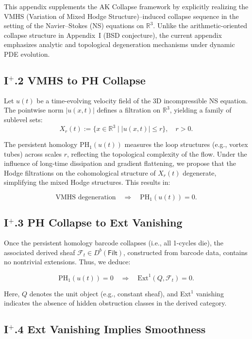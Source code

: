 \documentclass[11pt]{article}
\begin{document}
This appendix supplements the AK Collapse framework by explicitly realizing  
the VMHS (Variation of Mixed Hodge Structure)–induced collapse sequence  
in the setting of the Navier--Stokes (NS) equations on \( \mathbb{R}^3 \).  
Unlike the arithmetic-oriented collapse structure in Appendix~I (BSD conjecture),  
the current appendix emphasizes analytic and topological degeneration mechanisms  
under dynamic PDE evolution.

\subsection*{I$^+$.2 VMHS to PH Collapse}

Let \( u(t) \) be a time-evolving velocity field of the 3D incompressible NS equation.  
The pointwise norm \( |u(x,t)| \) defines a filtration on \( \mathbb{R}^3 \),  
yielding a family of sublevel sets:
\[
X_r(t) := \{ x \in \mathbb{R}^3 \mid |u(x,t)| \leq r \}, \quad r > 0.
\]

The persistent homology \( \mathrm{PH}_1(u(t)) \) measures the loop structures (e.g., vortex tubes)  
across scales \( r \), reflecting the topological complexity of the flow.  
Under the influence of long-time dissipation and gradient flattening,  
we propose that the Hodge filtrations on the cohomological structure  
of \( X_r(t) \) degenerate, simplifying the mixed Hodge structures.  
This results in:

\[
\text{VMHS degeneration} \quad \Rightarrow \quad \mathrm{PH}_1(u(t)) = 0.
\]

\subsection*{I$^+$.3 PH Collapse to Ext Vanishing}

Once the persistent homology barcode collapses (i.e., all 1-cycles die),  
the associated derived sheaf \( \mathcal{F}_t \in D^b(\mathsf{Filt}) \),  
constructed from barcode data, contains no nontrivial extensions.  
Thus, we deduce:

\[
\mathrm{PH}_1(u(t)) = 0 \quad \Rightarrow \quad \mathrm{Ext}^1(Q, \mathcal{F}_t) = 0.
\]

Here, \( Q \) denotes the unit object (e.g., constant sheaf), and Ext$^1$ vanishing indicates  
the absence of hidden obstruction classes in the derived category.

\subsection*{I$^+$.4 Ext Vanishing Implies Smoothness}
\end{document}
